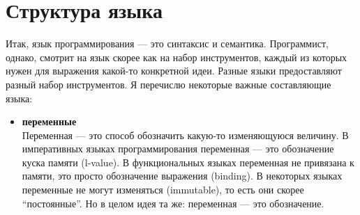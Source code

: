 \documentclass[11pt]{book}
\begin{document}
\section{Структура языка}
Итак, язык программирования --- это синтаксис и семантика.
Программист, однако, смотрит на язык скорее как на набор инструментов, каждый из которых нужен для выражения какой-то конкретной идеи.
Разные языки предоставляют разный набор инструментов.
Я перечислю некоторые важные составляющие языка:
\begin{itemize}
\item \textbf{переменные}
    \\
    Переменная --- это способ обозначить какую-то изменяющуюся величину.
    В императивных языках программирования переменная --- это обозначение куска памяти (l-value).
    В функциональных языках переменная не привязана к памяти, это просто обозначение выражения (binding).
    В некоторых языках переменные не могут изменяться (immutable), то есть они скорее ``постоянные''.
    Но в целом идея та же: переменная --- это обозначение.


\end{itemize}
\end{document}
